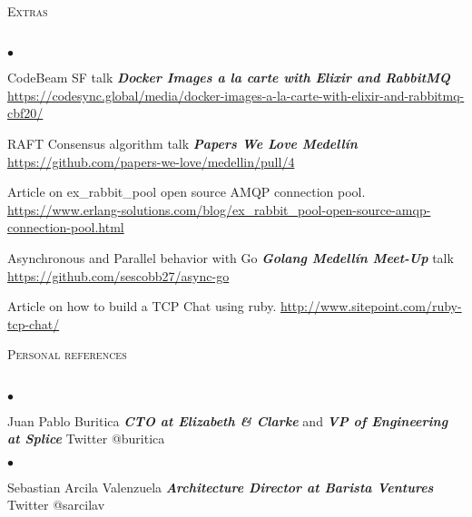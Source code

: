 \documentclass[a4paper]{article}
\newcommand{\lineunder}{\vspace*{-8pt} \\ \hspace*{-18pt} \hrulefill \\}
\newcommand{\header}[1]{{\hspace*{-15pt}\vspace*{6pt}
  \textsc{#1}} \vspace*{-6pt} \lineunder}
\newenvironment{achievements}{\begin{list}{$\bullet$}{\topsep 0pt \itemsep
  -2pt}}{\vspace*{4pt}\end{list}}
\newcommand{\emphasys}[1]{\textbf{\emph{#1}}}
\begin{document}
  \header{Extras}
  \begin{achievements}
  \item{CodeBeam SF talk \emphasys{Docker Images a la carte with Elixir and RabbitMQ} \url{https://codesync.global/media/docker-images-a-la-carte-with-elixir-and-rabbitmq-cbf20/}}
  \item{RAFT Consensus algorithm talk \emphasys{Papers We Love Medell\'in} \url{https://github.com/papers-we-love/medellin/pull/4}}
  \item{Article on ex\_rabbit\_pool open source AMQP connection pool. \url{https://www.erlang-solutions.com/blog/ex_rabbit_pool-open-source-amqp-connection-pool.html}}
  \item{Asynchronous and Parallel behavior with Go \emphasys{Golang Medell\'in Meet-Up} talk \url{https://github.com/sescobb27/async-go}}
  \item{Article on how to build a TCP Chat using ruby. \url{http://www.sitepoint.com/ruby-tcp-chat/}}
  \end{achievements}

  \header{Personal references}
  \begin{achievements}
  \item{Juan Pablo Buritica \emphasys{CTO at Elizabeth \& Clarke} and \emphasys{VP of Engineering at Splice} Twitter @buritica}
  \end{achievements}
  \begin{achievements}
  \item{Sebastian Arcila Valenzuela \emphasys{Architecture Director at Barista Ventures} Twitter @sarcilav}
  \end{achievements}
  
\end{document}
